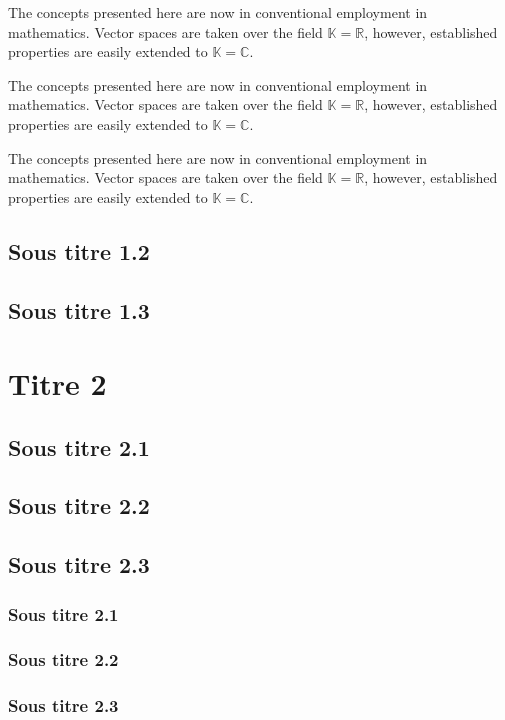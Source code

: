 \documentclass[10pt,fleqn]{article} %
\begin{document}
\begin{theorem}[Titre]
The concepts presented here are now in conventional employment in mathematics. Vector spaces are taken over the field $\mathbb{K}=\mathbb{R}$, however, established properties are easily extended to $\mathbb{K}=\mathbb{C}$.
\end{theorem}

\begin{definition}[Titre]
The concepts presented here are now in conventional employment in mathematics. Vector spaces are taken over the field $\mathbb{K}=\mathbb{R}$, however, established properties are easily extended to $\mathbb{K}=\mathbb{C}$.
\end{definition}

\begin{vocabulary}
The concepts presented here are now in conventional employment in mathematics. Vector spaces are taken over the field $\mathbb{K}=\mathbb{R}$, however, established properties are easily extended to $\mathbb{K}=\mathbb{C}$.
\end{vocabulary}

\subsection{Sous titre 1.2}
\lipsum[1-2]
\subsection{Sous titre 1.3}
\lipsum[1-2]
\section{Titre 2}
\subsection{Sous titre 2.1}
\subsection{Sous titre 2.2}
\subsection{Sous titre 2.3}
\subsubsection{Sous titre 2.1}
\subsubsection{Sous titre 2.2}
\subsubsection{Sous titre 2.3}
\end{document}
